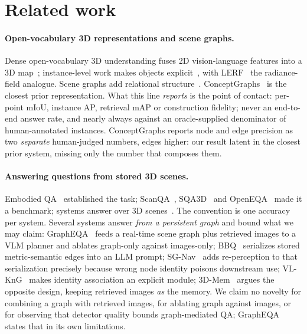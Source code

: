 \section{Related work}

\paragraph{Open-vocabulary 3D representations and scene graphs.}
Dense open-vocabulary 3D understanding fuses 2D vision-language features into a 3D
map~\cite{jatavallabhula2023conceptfusion, peng2023openscene}; instance-level work makes
objects explicit~\cite{takmaz2023openmask3d, nguyen2024open3dis, lu2023ovir3d}, with
LERF~\cite{kerr2023lerf} the radiance-field analogue. Scene graphs add relational
structure~\cite{armeni20193dscenegraph, wu2021scenegraphfusion, hughes2022hydra,
looper20233dvsg, koch2024open3dsg, werby2024hovsg, zhu2026ogscene3d}.
ConceptGraphs~\cite{gu2024conceptgraphs} is the closest prior representation. What this
line \emph{reports} is the point of contact: per-point mIoU, instance AP, retrieval mAP
or construction fidelity; never an end-to-end answer rate, and nearly always against
an oracle-supplied denominator of human-annotated instances. ConceptGraphs reports node
and edge precision as two \emph{separate} human-judged numbers, edges higher: our
result latent in the closest prior system, missing only the number that composes them.

\paragraph{Answering questions from stored 3D scenes.}
Embodied QA~\cite{das2018embodiedqa, gordon2018iqa} established the task;
ScanQA~\cite{azuma2022scanqa}, SQA3D~\cite{ma2023sqa3d} and
OpenEQA~\cite{majumdar2024openeqa} made it a benchmark; systems answer over 3D
scenes~\cite{hong20233dllm, huang2024leo, huang2024chatscene, zhu2025llava3d}. The
convention is one accuracy per system. Several systems answer \emph{from a persistent
graph} and bound what we may claim: GraphEQA~\cite{saxena2025grapheqa} feeds a real-time
scene graph plus retrieved images to a VLM planner and ablates graph-only against
images-only; BBQ~\cite{linok2025bbq} serializes stored metric-semantic edges into an LLM
prompt; SG-Nav~\cite{yin2024sgnav} adds re-perception to that serialization precisely
because wrong node identity poisons downstream use;
VL-KnG~\cite{almdfaa2026vlkng} makes identity association an explicit module;
3D-Mem~\cite{yang2025threedmem} argues the opposite design, keeping retrieved images
\emph{as} the memory. We claim no novelty for combining a graph with retrieved images,
for ablating graph against images, or for observing that detector quality bounds
graph-mediated QA; GraphEQA states that in its own limitations.

